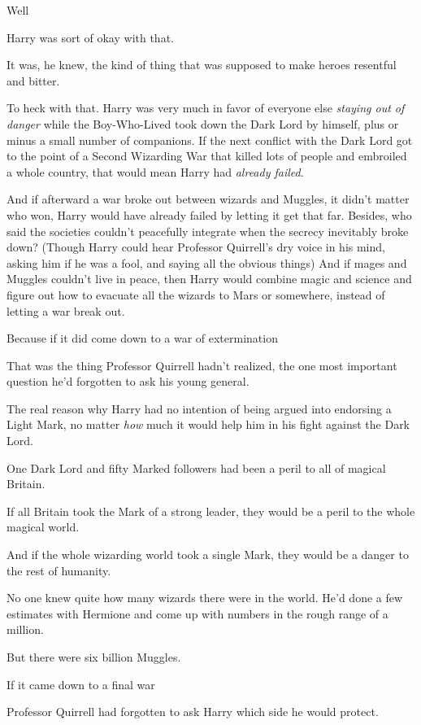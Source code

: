 Well{\el}

Harry was sort of okay with that.

It was, he knew, the kind of thing that was supposed to make heroes resentful
and bitter.

To heck with that. Harry was very much in favor of everyone else \emph{staying
out of danger} while the Boy-Who-Lived took down the Dark Lord by himself, plus
or minus a small number of companions. If the next conflict with the Dark Lord
got to the point of a Second Wizarding War that killed lots of people and
embroiled a whole country, that would mean Harry had \emph{already failed}.

And if afterward a war broke out between wizards and Muggles, it didn't matter
who won, Harry would have already failed by letting it get that far. Besides,
who said the societies couldn't peacefully integrate when the secrecy
inevitably broke down? (Though Harry could hear Professor Quirrell's dry voice
in his mind, asking him if he was a fool, and saying all the obvious
things{\el}) And if mages and Muggles couldn't live in peace, then Harry
would combine magic and science and figure out how to evacuate all the wizards
to Mars or somewhere, instead of letting a war break out.

Because if it did come down to a war of extermination{\el}

That was the thing Professor Quirrell hadn't realized, the one most important
question he'd forgotten to ask his young general.

The real reason why Harry had no intention of being argued into endorsing a
Light Mark, no matter \emph{how} much it would help him in his fight against
the Dark Lord.

One Dark Lord and fifty Marked followers had been a peril to all of magical
Britain.

If all Britain took the Mark of a strong leader, they would be a peril to the
whole magical world.

And if the whole wizarding world took a single Mark, they would be a danger to
the rest of humanity.

No one knew quite how many wizards there were in the world. He'd done a few
estimates with Hermione and come up with numbers in the rough range of a
million.

But there were six billion Muggles.

If it came down to a final war{\el}

Professor Quirrell had forgotten to ask Harry which side he would protect.


